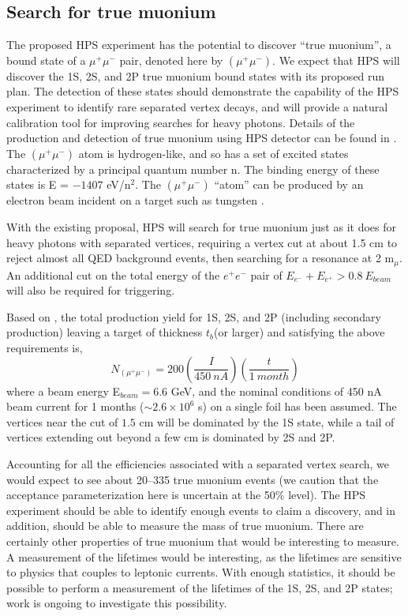 \subsection{Search for true muonium}

The proposed HPS experiment has the potential to discover ``true muonium'', a bound state of a
$\mu^+ \mu^-$ pair, denoted here by $(\mu^+ \mu^-)$. 
We expect that HPS will discover the 1S, 2S, and 2P true muonium bound states with its proposed run plan. 
The detection of these states should demonstrate the capability of the HPS experiment 
to identify rare separated vertex decays, and will provide a natural calibration 
tool for improving searches for heavy photons. Details of the production and detection of true muonium using HPS detector can be found in \cite{HPS_PROP_UPD}. 
The $(\mu^+ \mu^-)$ atom is hydrogen-like, and so has a set of excited states characterized by a principal quantum number n. 
The binding energy of these states is E = $-1407$ eV/n$^2$. The $(\mu^+ \mu^-)$ ``atom'' can be produced by an electron beam incident on a target such 
as tungsten \cite{Holvik:1986ty,ArteagaRomero:2000yh}. 

With the existing proposal, HPS will search for true muonium
just as it does for heavy photons with separated vertices, requiring a vertex cut at about 1.5 cm to reject almost all
QED background events, then searching for a resonance at 2 m$_{\mu}$. An additional cut 
on the total energy of the $e^+e^-$ pair of $E_{e^-}+E_{e^+}> 0.8 \ E_{beam}$ will also be required
for triggering. 

Based on \cite{toAppear}, the total production yield for 1S, 2S, and 2P (including secondary production)
leaving a target of thickness $t_b$(or larger) and satisfying the above requirements is,
\begin{equation}
N_{(\mu^+ \mu^-)} = 200 \left( \frac{I}{450 \ nA} \right) \left( \frac{t}{1 \ month} \right)
\end{equation}
%
where a beam energy E$_{beam} = 6.6$ GeV, and the nominal conditions
of 450 nA beam current for 1 months ($\sim 2.6 \times 10^6$ s) on a single foil has been assumed.
The vertices near the cut of $1.5$ cm will be dominated by the 1S state, while 
a tail of vertices extending out beyond a few cm is dominated by 2S and 2P. 

Accounting for all the efficiencies associated with a separated vertex search, we would expect to see about 20--335 true muonium events 
(we caution that the acceptance parameterization here is uncertain at the 50\% level).
The HPS experiment should be able to identify enough events to claim a discovery, and in addition, should be able to measure the mass of true muonium.  There are certainly other properties of true muonium that would be interesting to measure.  A measurement of the lifetimes would be interesting, as the lifetimes are sensitive to physics that couples to leptonic currents.  With enough statistics, it should be possible to perform a measurement of the lifetimes of the 1S, 2S, and 2P states; work is ongoing to investigate this possibility.  

